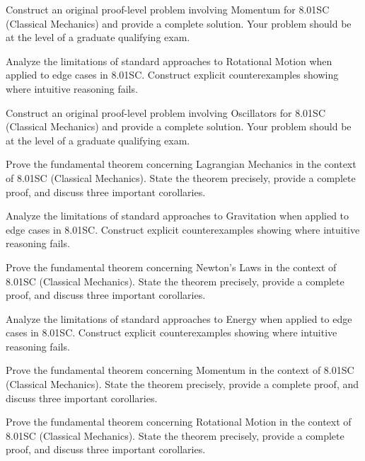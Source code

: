 \documentclass[12pt,a4paper]{exam}
\begin{document}
\begin{questions}
\vspace{0.3cm}

\question[4]
Construct an original proof-level problem involving Momentum for 8.01SC (Classical Mechanics) and provide a complete solution. Your problem should be at the level of a graduate qualifying exam.

\vspace{0.3cm}

\question[4]
Analyze the limitations of standard approaches to Rotational Motion when applied to edge cases in 8.01SC. Construct explicit counterexamples showing where intuitive reasoning fails.

\vspace{0.3cm}

\question[3]
Construct an original proof-level problem involving Oscillators for 8.01SC (Classical Mechanics) and provide a complete solution. Your problem should be at the level of a graduate qualifying exam.

\vspace{0.3cm}

\question[4]
Prove the fundamental theorem concerning Lagrangian Mechanics in the context of 8.01SC (Classical Mechanics). State the theorem precisely, provide a complete proof, and discuss three important corollaries.

\vspace{0.3cm}

\question[6]
Analyze the limitations of standard approaches to Gravitation when applied to edge cases in 8.01SC. Construct explicit counterexamples showing where intuitive reasoning fails.

\vspace{0.3cm}

\question[3]
Prove the fundamental theorem concerning Newton's Laws in the context of 8.01SC (Classical Mechanics). State the theorem precisely, provide a complete proof, and discuss three important corollaries.

\vspace{0.3cm}

\question[6]
Analyze the limitations of standard approaches to Energy when applied to edge cases in 8.01SC. Construct explicit counterexamples showing where intuitive reasoning fails.

\vspace{0.3cm}

\question[4]
Prove the fundamental theorem concerning Momentum in the context of 8.01SC (Classical Mechanics). State the theorem precisely, provide a complete proof, and discuss three important corollaries.

\vspace{0.3cm}

\question[4]
Prove the fundamental theorem concerning Rotational Motion in the context of 8.01SC (Classical Mechanics). State the theorem precisely, provide a complete proof, and discuss three important corollaries.

\vspace{0.3cm}

\end{questions}
\end{document}
